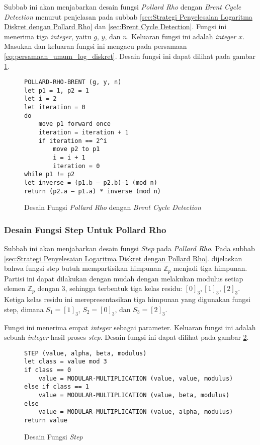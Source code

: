 Subbab ini akan menjabarkan desain fungsi \textit{Pollard Rho} dengan \textit{Brent Cycle Detection} menurut penjelasan pada subbab \ref{sec:Strategi Penyelesaian Logaritma Diskret dengan Pollard Rho} dan \ref{sec:Brent Cycle Detection}. Fungsi ini menerima tiga \textit{integer}, yaitu $ g $, $ y $, dan $ n $. Keluaran fungsi ini adalah \textit{integer} $ x $. Masukan dan keluaran fungsi ini mengacu pada persamaan \eqref{eq:persamaan_umum_log_diskret}. Desain fungsi ini dapat dilihat pada gambar \ref{psdo:brent_pollard_rho}.
\begin{figure}[h!]
\begin{lstlisting}[firstnumber=0]
POLLARD-RHO-BRENT (g, y, n)
let p1 = 1, p2 = 1
let i = 2
let iteration = 0
do
	move p1 forward once 
	iteration = iteration + 1
	if iteration == 2^i
		move p2 to p1
		i = i + 1
		iteration = 0
while p1 != p2
let inverse = (p1.b – p2.b)-1 (mod n)
return (p2.a – p1.a) * inverse (mod n)
\end{lstlisting}
\caption{Desain Fungsi \textit{Pollard Rho} dengan \textit{Brent Cycle Detection}}
\label{psdo:brent_pollard_rho}
\end{figure}

\subsubsection {Desain Fungsi Step Untuk Pollard Rho}
Subbab ini akan menjabarkan desain fungsi \textit{Step} pada \textit{Pollard Rho}. Pada subbab \ref{sec:Strategi Penyelesaian Logaritma Diskret dengan Pollard Rho}. dijelaskan bahwa fungsi step butuh mempartisikan himpunan $ \mathbb{Z}_p $ menjadi tiga himpunan. Partisi ini dapat dilakukan dengan mudah dengan melakukan modulus setiap elemen $ \mathbb{Z}_p $ dengan 3, sehingga terbentuk tiga kelas residu: $ [0]_3,[1]_3,[2]_3 $. Ketiga kelas residu ini merepresentasikan tiga himpunan yang digunakan fungsi \textit{}step, dimana $ S_1=[1]_3 $, $ S_2=[0]_3 $, dan $ S_3=[2]_3 $.

Fungsi ini menerima empat \textit{integer} sebagai parameter. Keluaran fungsi ini adalah sebuah \textit{integer} hasil proses \textit{step}. Desain fungsi ini dapat dilihat pada gambar \ref{psdo:step}.
\begin{figure}[h!]
\begin{lstlisting}[firstnumber=0]
STEP (value, alpha, beta, modulus)
let class = value mod 3
if class == 0
	value = MODULAR-MULTIPLICATION (value, value, modulus)
else if class == 1
	value = MODULAR-MULTIPLICATION (value, beta, modulus)
else
	value = MODULAR-MULTIPLICATION (value, alpha, modulus)
return value
\end{lstlisting}
\caption{Desain Fungsi \textit{Step}}
\label{psdo:step}
\end{figure}

